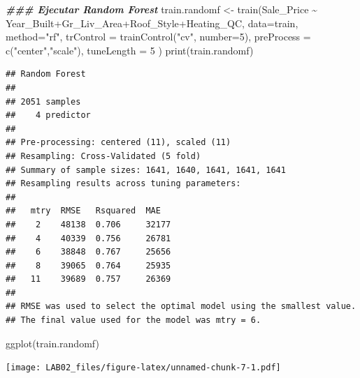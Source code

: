 \documentclass[
]{article}
\newenvironment{Shaded}{\begin{snugshade}}{\end{snugshade}}
\newcommand{\AttributeTok}[1]{\textcolor[rgb]{0.77,0.63,0.00}{#1}}
\newcommand{\DecValTok}[1]{\textcolor[rgb]{0.00,0.00,0.81}{#1}}
\newcommand{\DocumentationTok}[1]{\textcolor[rgb]{0.56,0.35,0.01}{\textbf{\textit{#1}}}}
\newcommand{\FunctionTok}[1]{\textcolor[rgb]{0.00,0.00,0.00}{#1}}
\newcommand{\NormalTok}[1]{#1}
\newcommand{\OtherTok}[1]{\textcolor[rgb]{0.56,0.35,0.01}{#1}}
\newcommand{\SpecialCharTok}[1]{\textcolor[rgb]{0.00,0.00,0.00}{#1}}
\newcommand{\StringTok}[1]{\textcolor[rgb]{0.31,0.60,0.02}{#1}}
\begin{document}
\begin{Shaded}
\begin{Highlighting}[]
\DocumentationTok{\#\#\# Ejecutar Random Forest}
\NormalTok{train.randomf }\OtherTok{\textless{}{-}} \FunctionTok{train}\NormalTok{(Sale\_Price }\SpecialCharTok{\textasciitilde{}}\NormalTok{ Year\_Built}\SpecialCharTok{+}\NormalTok{Gr\_Liv\_Area}\SpecialCharTok{+}\NormalTok{Roof\_Style}\SpecialCharTok{+}\NormalTok{Heating\_QC, }
                       \AttributeTok{data=}\NormalTok{train, }\AttributeTok{method=}\StringTok{"rf"}\NormalTok{,  }
                       \AttributeTok{trControl =} \FunctionTok{trainControl}\NormalTok{(}\StringTok{"cv"}\NormalTok{, }\AttributeTok{number=}\DecValTok{5}\NormalTok{),}
                       \AttributeTok{preProcess =} \FunctionTok{c}\NormalTok{(}\StringTok{"center"}\NormalTok{,}\StringTok{"scale"}\NormalTok{),}
                       \AttributeTok{tuneLength =} \DecValTok{5} 
\NormalTok{)}
\FunctionTok{print}\NormalTok{(train.randomf)}
\end{Highlighting}
\end{Shaded}

\begin{verbatim}
## Random Forest 
## 
## 2051 samples
##    4 predictor
## 
## Pre-processing: centered (11), scaled (11) 
## Resampling: Cross-Validated (5 fold) 
## Summary of sample sizes: 1641, 1640, 1641, 1641, 1641 
## Resampling results across tuning parameters:
## 
##   mtry  RMSE   Rsquared  MAE  
##    2    48138  0.706     32177
##    4    40339  0.756     26781
##    6    38848  0.767     25656
##    8    39065  0.764     25935
##   11    39689  0.757     26369
## 
## RMSE was used to select the optimal model using the smallest value.
## The final value used for the model was mtry = 6.
\end{verbatim}

\begin{Shaded}
\begin{Highlighting}[]
\FunctionTok{ggplot}\NormalTok{(train.randomf)}
\end{Highlighting}
\end{Shaded}

\texttt{[image: LAB02\_files/figure-latex/unnamed-chunk-7-1.pdf]}

\begin{Shaded}
\end{Shaded}
\end{document}
